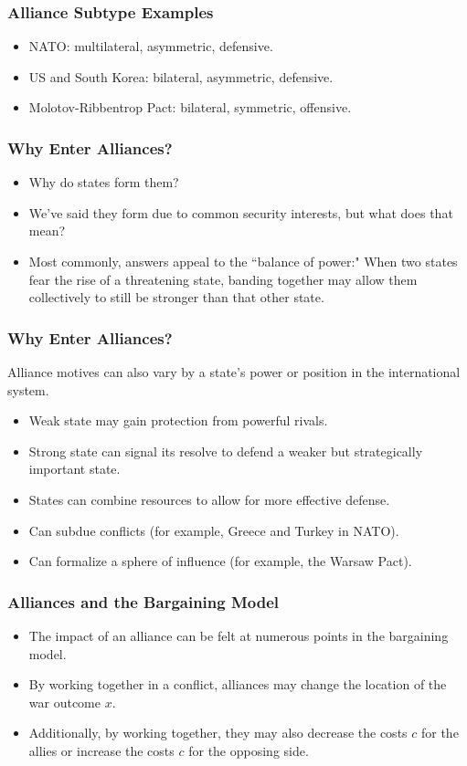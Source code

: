 \documentclass{beamer}
\begin{document}
\begin{frame} 
	\frametitle{\LARGE{Alliance Subtype Examples}}
	\begin{itemize}
		\item NATO: multilateral, asymmetric, defensive. \pause
		\item US and South Korea: bilateral, asymmetric, defensive. \pause
		\item Molotov-Ribbentrop Pact: bilateral, symmetric, offensive.
	\end{itemize}
\end{frame}

\begin{frame} 
\frametitle{\LARGE{Why Enter Alliances?}}
	\begin{itemize}
		\item Why do states form them? 
		\item We've said they form due to common security interests, but what does that mean? \pause 
		\item Most commonly, answers appeal to the ``balance of power:" When two states fear the rise of a threatening state, banding together may allow them collectively to still be stronger than that other state.
	\end{itemize}
\end{frame}

\begin{frame} 
	\frametitle{\LARGE{Why Enter Alliances?}}
Alliance motives can also vary by a state's power or position in the international system.
	\begin{itemize}
		\item Weak state may gain protection from powerful rivals. \pause
		\item Strong state can signal its resolve to defend a weaker but strategically important state. \pause
		\item States can combine resources to allow for more effective defense. \pause
		\item Can subdue conflicts (for example, Greece and Turkey in NATO). \pause
		\item Can formalize a sphere of influence (for example, the Warsaw Pact). 		
	\end{itemize}
\end{frame}

\begin{frame} 
	\frametitle{\LARGE{Alliances and the Bargaining Model}}
	\begin{itemize}
		\item The impact of an alliance can be felt at numerous points in the bargaining model. \pause
		\item By working together in a conflict, alliances may change the location of the war outcome $x$. \pause
		\item Additionally, by working together, they may also decrease the costs $c$ for the allies or increase the costs $c$ for the opposing side.		
	\end{itemize}
\end{frame}
\end{document}
